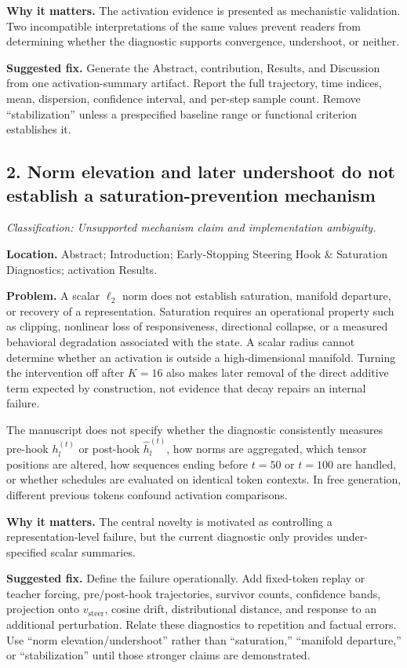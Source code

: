 \documentclass[11pt]{article}
\newcommand{\findinglabel}[1]{\textbf{#1}}
\newcommand{\classification}[1]{\textit{Classification: #1.}}
\begin{document}
\findinglabel{Why it matters.} The activation evidence is presented as mechanistic validation.  Two incompatible interpretations of the same values prevent readers from determining whether the diagnostic supports convergence, undershoot, or neither.

\findinglabel{Suggested fix.} Generate the Abstract, contribution, Results, and Discussion from one activation-summary artifact.  Report the full trajectory, time indices, mean, dispersion, confidence interval, and per-step sample count.  Remove ``stabilization'' unless a prespecified baseline range or functional criterion establishes it.

\subsection*{2. Norm elevation and later undershoot do not establish a saturation-prevention mechanism}

\classification{Unsupported mechanism claim and implementation ambiguity}

\findinglabel{Location.} Abstract; Introduction; Early-Stopping Steering Hook \& Saturation Diagnostics; activation Results.

\findinglabel{Problem.} A scalar $\ell_2$ norm does not establish saturation, manifold departure, or recovery of a representation.  Saturation requires an operational property such as clipping, nonlinear loss of responsiveness, directional collapse, or a measured behavioral degradation associated with the state.  A scalar radius cannot determine whether an activation is outside a high-dimensional manifold.  Turning the intervention off after $K=16$ also makes later removal of the direct additive term expected by construction, not evidence that decay repairs an internal failure.

The manuscript does not specify whether the diagnostic consistently measures pre-hook $h_l^{(t)}$ or post-hook $\hat h_l^{(t)}$, how norms are aggregated, which tensor positions are altered, how sequences ending before $t=50$ or $t=100$ are handled, or whether schedules are evaluated on identical token contexts.  In free generation, different previous tokens confound activation comparisons.

\findinglabel{Why it matters.} The central novelty is motivated as controlling a representation-level failure, but the current diagnostic only provides under-specified scalar summaries.

\findinglabel{Suggested fix.} Define the failure operationally.  Add fixed-token replay or teacher forcing, pre/post-hook trajectories, survivor counts, confidence bands, projection onto $v_{\text{steer}}$, cosine drift, distributional distance, and response to an additional perturbation.  Relate these diagnostics to repetition and factual errors.  Use ``norm elevation/undershoot'' rather than ``saturation,'' ``manifold departure,'' or ``stabilization'' until those stronger claims are demonstrated.
\end{document}
